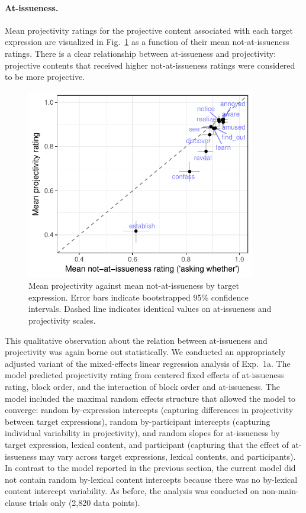 \documentclass[11pt,fleqn]{article}
\newcommand{\6}{\mbox{$[\hspace*{-.6mm}[$}}
\newcommand{\9}{\mbox{$]\hspace*{-.6mm}]$}}
\newcommand{\figref}[1]{Fig.~\ref{#1}}
\begin{document}
\paragraph{At-issueness.} Mean projectivity ratings for the projective content associated with each target expression are visualized in \figref{fig:f-proj-ai-1b} as a function of their mean not-at-issueness ratings. There is a clear relationship between at-issueness and projectivity: projective contents that received higher not-at-issueness ratings were considered to be more projective. 

\begin{figure}[!h]

\begin{center}
\includegraphics[width=10cm]{../results/exp1b/graphs/ai-proj-bytrigger-labels}
\end{center}

\caption{Mean projectivity against mean not-at-issueness by target expression. Error bars indicate bootstrapped 95\% confidence intervals. Dashed line indicates identical values on at-issueness and projectivity scales.}
\label{fig:f-proj-ai-1b}
\end{figure}

This qualitative observation about the relation between at-issueness and projectivity was again borne out statistically. We conducted an appropriately adjusted variant of the mixed-effects linear regression analysis of Exp.~1a. The model predicted projectivity rating from centered fixed effects of at-issueness rating, block order, and the interaction of block order and at-issueness. The model included the maximal random effects structure that allowed the model to converge: random by-expression intercepts (capturing differences in projectivity between target expressions),  random by-participant intercepts (capturing individual variability in projectivity), and random slopes for at-issueness by target expression, lexical content, and participant (capturing that the effect of at-issueness may vary across target expressions, lexical contents, and participants). In contrast to the model reported in the previous section, the current model did not contain random by-lexical content intercepts because there was no by-lexical content intercept variability. As before, the analysis was conducted on non-main-clause trials only (2,820 data points).
\end{document}
